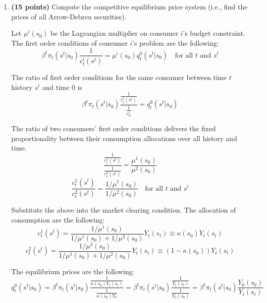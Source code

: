 \documentclass[12pt, oneside]{article}
\begin{document}
\begin{enumerate}
\begin{enumerate}
A competitive equilibrium with a complete set of Arrow-Debreu securities is defined after observing the initial state $s_0$. It consists of a set of prices $\{q^0_t(s^t|s_0)\}_{t=0}^\infty, q^0_0=1$ and an allocation $\{c^1_t(s^t), c^2_t(s^t)\}_{t=0}^\infty$ such that
    \begin{itemize}
    \item given prices $\{q^0_t(s^t|s_0)\}_{t=0}^\infty$, for each $i \in \{1,2\}$, $\{c^i_t(s^t)\}_{t=0}^\infty$ solves the following optimization problem;
    \[ \max_{c^i_t(s^t)} \sum_{t=0}^\infty \sum_{s^t} \beta^t \ln [c^i_t(s^t)] \pi_t(s^t|s_0) \]
    \[ \mbox{s.t.} \quad \sum_{t=0}^\infty \sum_{s^t} q^0_t(s^t|s_0) c^i_t(s^t) = \sum_{t=0}^\infty \sum_{s^t} q^0_t(s^t|s_0) y^i(s_t) \]

    \item and prices clear all markets, i.e., for all $s^t$ and $t$
    \[ c_t^1(s^t) + c_t^2(s^t) = y^1(s_t) + y^2(s_t) = Y(s_t). \]
    \end{itemize}

\item \textbf{(15 points)} Compute the competitive equilibrium price system (i.e., find the prices of all  Arrow-Debreu
securities).

Let $\mu^i(s_0)$ be the Lagrangian multiplier on consumer $i$'s budget constraint. The first order conditions of consumer $i$'s problem are the following:
\[ \beta^t \pi_t(s^t|s_0) \frac{1}{c^i_t(s^t)} = \mu^i(s_0) q^0_t(s^t|s_0)  \quad \mbox{for all $t$ and $s^t$} \]

The ratio of first order conditions for the same consumer between time $t$ history $s^t$ and time 0 is
\[ \beta^t \pi_t(s^t|s_0) \frac{\frac{1}{c^i_t(s^t)}}{\frac{1}{c^i_0}} = q^0_t(s^t|s_0) \]

The ratio of two consumers' first order conditions delivers the fixed proportionality between their consumption allocations over all history and time.
\[ \frac{\frac{1}{c^1_t(s^t)}}{\frac{1}{c^2_t(s^t)}} = \frac{\mu^1(s_0)}{\mu^2(s_0)} \]
\[ \frac{c^1_t(s^t)}{c^2_t(s^t)} = \frac{1/\mu^1(s_0)}{1/\mu^2(s_0)} \quad \mbox{for all $t$ and $s^t$} \]

Substitute the above into the market clearing condition. The allocation of consumption are the following:
\[ c^1_t(s^t) = \frac{1/\mu^1(s_0)}{1/\mu^1(s_0) + 1/\mu^2(s_0)} Y_t(s_t) \equiv \kappa(s_0) Y_t(s_t)  \]
\[ c^2_t(s^t) = \frac{1/\mu^2(s_0)}{1/\mu^1(s_0) + 1/\mu^2(s_0)} Y_t(s_t) \equiv (1-\kappa(s_0)) Y_t(s_t) \]

The equilibrium prices are the following:
\[ q^0_t(s^t|s_0) = \beta^t \pi_t(s^t|s_0) \frac{\frac{1}{\kappa(s_0) Y_t(s_t)}}{\frac{1}{\kappa(s_0) Y_0}} =\beta^t \pi_t(s^t|s_0) \frac{\frac{1}{Y_t(s_t)}}{\frac{1}{Y_0(s_0)}} =  \beta^t \pi_t(s^t|s_0) \frac{Y_0(s_0)}{Y_t(s_t)} \]


\end{enumerate}
\end{enumerate}
\end{document}
